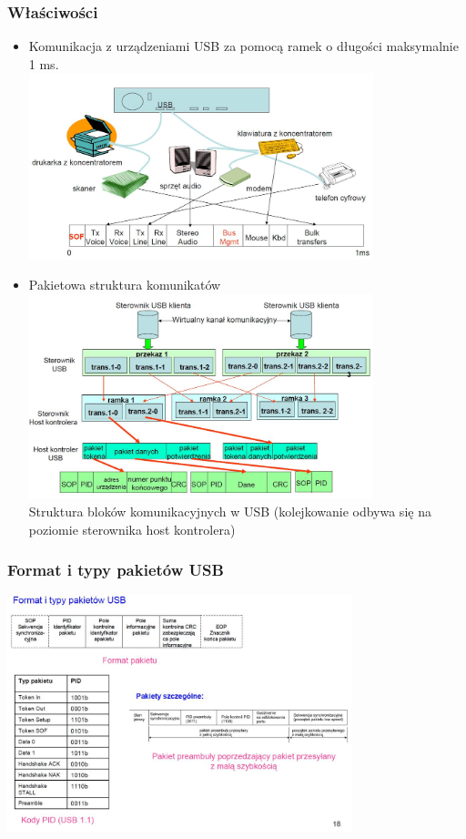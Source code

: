 	\subsubsection{Właściwości}
	\begin{itemize}
		\item Komunikacja z urządzeniami USB za pomocą ramek o długości maksymalnie 1 ms.\\
		\includegraphics[width=10cm]{./wyklady/USB_18_1.jpg}
		\item Pakietowa struktura komunikatów\\
		\includegraphics[width=10cm]{./wyklady/USB_19_1.jpg}\\
		Struktura bloków komunikacyjnych w USB (kolejkowanie odbywa się na poziomie sterownika host kontrolera)
	\end{itemize}
	\subsubsection{Format i typy pakietów USB}
	\includegraphics[width=10cm]{./wyklady/USB_20_1.jpg}
